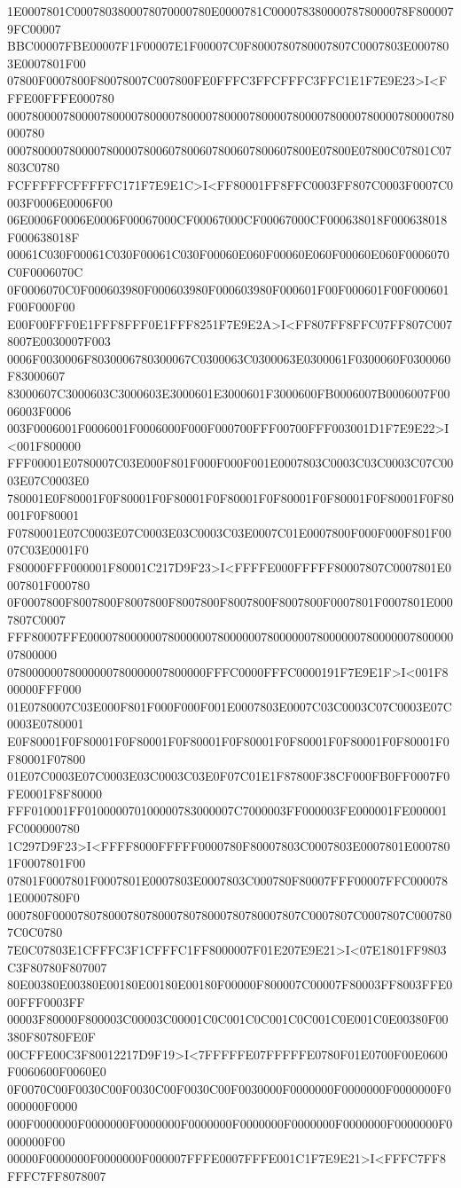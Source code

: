 1E0007801C0007803800078070000780E0000781C0000783800007878000078F8000079FC00007
BBC00007FBE00007F1F00007E1F00007C0F8000780780007807C0007803E0007803E0007801F00
07800F0007800F80078007C007800FE0FFFC3FFCFFFC3FFC1E1F7E9E23>I<FFFE00FFFE000780
000780000780000780000780000780000780000780000780000780000780000780000780000780
0007800007800007800007800607800607800607800607800E07800E07800C07801C07803C0780
FCFFFFFCFFFFFC171F7E9E1C>I<FF80001FF8FFC0003FF807C0003F0007C0003F0006E0006F00
06E0006F0006E0006F00067000CF00067000CF00067000CF000638018F000638018F000638018F
00061C030F00061C030F00061C030F00060E060F00060E060F00060E060F0006070C0F0006070C
0F0006070C0F000603980F000603980F000603980F000601F00F000601F00F000601F00F000F00
E00F00FFF0E1FFF8FFF0E1FFF8251F7E9E2A>I<FF807FF8FFC07FF807C0078007E0030007F003
0006F0030006F8030006780300067C0300063C0300063E0300061F0300060F0300060F83000607
83000607C3000603C3000603E3000601E3000601F3000600FB0006007B0006007F0006003F0006
003F0006001F0006001F0006000F000F000700FFF00700FFF003001D1F7E9E22>I<001F800000
FFF00001E0780007C03E000F801F000F000F001E0007803C0003C03C0003C07C0003E07C0003E0
780001E0F80001F0F80001F0F80001F0F80001F0F80001F0F80001F0F80001F0F80001F0F80001
F0780001E07C0003E07C0003E03C0003C03E0007C01E0007800F000F000F801F0007C03E0001F0
F80000FFF000001F80001C217D9F23>I<FFFFE000FFFFF80007807C0007801E0007801F000780
0F0007800F8007800F8007800F8007800F8007800F8007800F0007801F0007801E0007807C0007
FFF80007FFE0000780000007800000078000000780000007800000078000000780000007800000
07800000078000000780000007800000FFFC0000FFFC0000191F7E9E1F>I<001F800000FFF000
01E0780007C03E000F801F000F000F001E0007803E0007C03C0003C07C0003E07C0003E0780001
E0F80001F0F80001F0F80001F0F80001F0F80001F0F80001F0F80001F0F80001F0F80001F07800
01E07C0003E07C0003E03C0003C03E0F07C01E1F87800F38CF000FB0FF0007F0FE0001F8F80000
FFF010001FF010000070100000783000007C7000003FF000003FE000001FE000001FC000000780
1C297D9F23>I<FFFF8000FFFFF0000780F80007803C0007803E0007801E0007801F0007801F00
07801F0007801F0007801E0007803E0007803C000780F80007FFF00007FFC0000781E0000780F0
000780F0000780780007807800078078000780780007807C0007807C0007807C0007807C0C0780
7E0C07803E1CFFFC3F1CFFFC1FF8000007F01E207E9E21>I<07E1801FF9803C3F80780F807007
80E00380E00380E00180E00180E00180F00000F800007C00007F80003FF8003FFE000FFF0003FF
00003F80000F800003C00003C00001C0C001C0C001C0C001C0E001C0E00380F00380F80780FE0F
00CFFE00C3F80012217D9F19>I<7FFFFFE07FFFFFE0780F01E0700F00E0600F0060600F0060E0
0F0070C00F0030C00F0030C00F0030C00F0030000F0000000F0000000F0000000F0000000F0000
000F0000000F0000000F0000000F0000000F0000000F0000000F0000000F0000000F0000000F00
00000F0000000F0000000F000007FFFE0007FFFE001C1F7E9E21>I<FFFC7FF8FFFC7FF8078007
